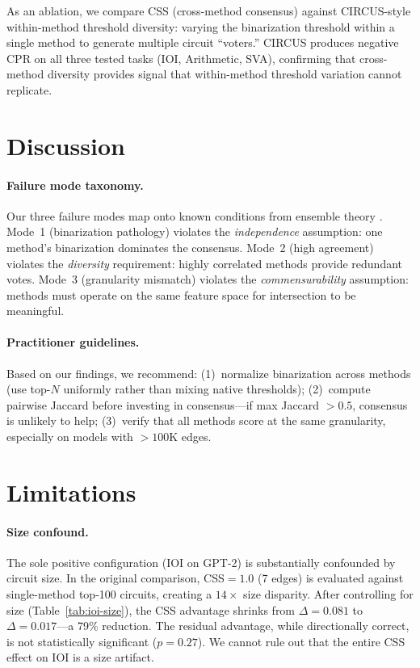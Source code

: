 \documentclass[11pt,a4paper]{article}
\newcommand{\css}{\textsc{CSS}}
\newcommand{\cpr}{\textsc{CPR}}
\begin{document}
As an ablation, we compare \css{} (cross-method consensus) against CIRCUS-style within-method threshold diversity: varying the binarization threshold within a single method to generate multiple circuit ``voters.'' CIRCUS produces negative \cpr{} on all three tested tasks (IOI, Arithmetic, SVA), confirming that cross-method diversity provides signal that within-method threshold variation cannot replicate.

\section{Discussion}

\paragraph{Failure mode taxonomy.}
Our three failure modes map onto known conditions from ensemble theory \cite{kuncheva2003measures}. Mode~1 (binarization pathology) violates the \emph{independence} assumption: one method's binarization dominates the consensus. Mode~2 (high agreement) violates the \emph{diversity} requirement: highly correlated methods provide redundant votes. Mode~3 (granularity mismatch) violates the \emph{commensurability} assumption: methods must operate on the same feature space for intersection to be meaningful.

\paragraph{Practitioner guidelines.}
Based on our findings, we recommend: (1)~normalize binarization across methods (use top-$N$ uniformly rather than mixing native thresholds); (2)~compute pairwise Jaccard before investing in consensus---if max Jaccard $> 0.5$, consensus is unlikely to help; (3)~verify that all methods score at the same granularity, especially on models with $> 100$K edges.

\section{Limitations}
\label{sec:limitations}

\paragraph{Size confound.}
The sole positive configuration (IOI on GPT-2) is substantially confounded by circuit size. In the original comparison, \css{}$=1.0$ (7 edges) is evaluated against single-method top-100 circuits, creating a $14\times$ size disparity. After controlling for size (Table~\ref{tab:ioi-size}), the \css{} advantage shrinks from $\Delta=0.081$ to $\Delta=0.017$---a 79\% reduction. The residual advantage, while directionally correct, is not statistically significant ($p=0.27$). We cannot rule out that the entire \css{} effect on IOI is a size artifact.
\end{document}
